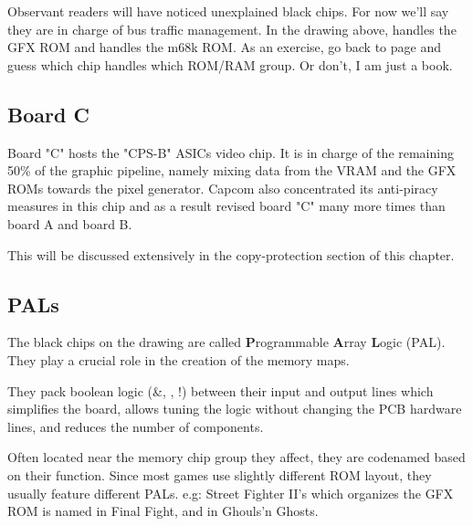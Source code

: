 
Observant readers will have noticed unexplained black chips. For now we'll say they are in charge of bus traffic management. In the drawing above,  handles the GFX ROM and  handles the m68k ROM. As an exercise, go back to page \pageref{fig:drawboarda} and guess which chip handles which ROM/RAM group. Or don't, I am just a book.

\subsection{Board C}
Board "C" hosts the "CPS-B" ASICs video chip. It is in charge of the remaining 50\% of the graphic pipeline, namely mixing data from the VRAM and the GFX ROMs towards the pixel generator. Capcom also concentrated its anti-piracy measures in this chip and as a result revised board "C" many more times than board A and board B. 

This will be discussed extensively in the copy-protection section of this chapter.

\begin{minipage}[t]{0.49\linewidth}
\end{minipage}%
\hfill%
\begin{minipage}[t]{0.49\linewidth}
\end{minipage}



\subsection{PALs}
The black chips on the drawing are called \textbf{P}rogrammable \textbf{A}rray \textbf{L}ogic (PAL). They play a crucial role in the creation of the memory maps. 

They pack boolean logic (\&, \textbar, !) between their input and output lines which simplifies the board, allows tuning the logic without changing the PCB hardware lines, and reduces the number of components.


 Often located near the memory chip group they affect, they are codenamed based on their function. Since most games use slightly different ROM layout, they usually feature different PALs. e.g: Street Fighter II's  which organizes the GFX ROM is named  in Final Fight, and  in Ghouls'n Ghosts.



